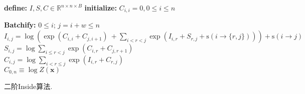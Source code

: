 \begin{algorithm}[tb]
    \begin{algorithmic}[1]
        \newlength{\commentindent}
        \setlength{\commentindent}{.3\textwidth}
        \setlength{\algorithmicindent}{1.5em}
        \renewcommand{\algorithmiccomment}[1]{\unskip\hfill\makebox[\commentindent][l]{$\rhd$~#1}\par}
        \LetLtxMacro{\oldalgorithmic}{\algorithmic}
        \renewcommand{\algorithmic}[1][0]{
            \oldalgorithmic[#1]
            \renewcommand{\ALC@com}[1]{
                \ifnum\pdfstrcmp{##1}{default}=0\else\algorithmiccomment{##1}\fi}%
        }
        \STATE \textbf{define:} $I,S,C \in \mathbb{R}^{n \times n \times B}$ 
        \STATE \textbf{initialize:} $C_{i, i}  = 0, 0 \le i \le n$

        \STATE \textbf{Batchify:} $0 \le i$; $j=i+w \le n$
        \STATE $I_{i, j} = \log\left(\exp\left(C_{i, i}  +  C_{j, i+1}\right) ~ +\sum\limits_{i < r < j} \exp\left(I_{i, r} + S_{r, j}+ \mathrm{s}(i\rightarrow \{r,j\})\right)\right) + \mathrm{s}(i\rightarrow j)$
        \STATE $S_{i, j} = \log \sum\limits_{i \le r < j} \exp\left(C_{i, r}  +  C_{j, r+1}\right) $ \\
        \STATE $C_{i, j} = \log \sum\limits_{i < r \le j} \exp\left(I_{i, r}  +  C_{r, j}\right)  $ \\
        \ENDFOR {}
        \RETURN $C_{0, n} \equiv \log Z(\boldsymbol{x})$
    \end{algorithmic}
    \caption{二阶Inside算法.}
    \label{alg:eisner-2o}
\end{algorithm}
